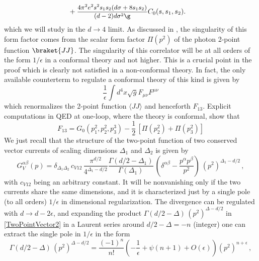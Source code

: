 \documentclass[a4paper,11pt,openright,twoside]{book}
\newcommand{\sdfrac}[2]{\mbox{\small$\displaystyle\frac{#1}{#2}$}}
\numberwithin{equation}{section}
\begin{document}
{{\begin{align}
	&+\sdfrac{4 \pi ^2 e^2 s^2 s_1 s_2 ( d \sigma +8 s_1 s_2)}{( d-2)  d \sigma ^2 \g}C_0(s,s_1,s_2).
\end{align}
which we will study in the $d\to 4$ limit. As discussed in \cite{Giannotti:2008cv, Armillis:2009pq}, the singularity of this form factor comes from the scalar form factor $\Pi(p^2)$ of the photon 2-point function $\braket{JJ}$. 
The singularity of this correlator will be at all orders of the form $1/\epsilon$ in a conformal theory and not higher. This is 
a crucial point in the proof which is clearly not satisfied in a non-conformal theory. In fact, the only available counterterm to regulate a conformal theory of this kind is given by 
\begin{equation}
	\frac{1}{\epsilon}\int d^4 x \sqrt{g} F_{\mu\nu}F^{\mu\nu}
\end{equation}
which renormalizes the 2-point function $\langle JJ \rangle$ and henceforth $F_{13}$. Explicit computations in QED at one-loop, where the theory is conformal, show that 
\begin{equation}
	\label{f13}
	F_{13}= G_0(p_1^2, p_2^2,p_3^3) -\frac{1}{2} \, [\Pi (p_2^2) +\Pi (p_3^2)]
\end{equation}
We just recall that the structure of the two-point function of two conserved vector currents of scaling dimensions $\Delta_1$ and $\Delta_2$ is given by \cite{Coriano:2013jba}
\begin{equation}
	\label{TwoPointVector2}
	G_V^{\alpha \beta}(p) = \delta_{\Delta_1 \Delta_2}  \, c_{V 12}\, 
	\frac{\pi^{d/2}}{4^{\Delta_1 - d/2}} \frac{\Gamma(d/2 - \Delta_1)}{\Gamma(\Delta_1)}\,
	\left( \delta^{\alpha \beta} -\frac{p^\alpha p^\beta}{p^2} \right)\
	(p^2)^{\Delta_1-d/2} \,,
\end{equation}
%
with $c_{V12}$ being an arbitrary constant. It will be nonvanishing only if the two currents share the same dimensions, and it is characterized just by a single pole (to all orders) ${1/\epsilon}$ in dimensional regularization. The divergence can be regulated with $d \to d - 2 \epsilon$, and expanding the product $\Gamma(d/2-\Delta)\,(p^2)^{\Delta - d/2}$ in \ref{TwoPointVector2} in a Laurent series around $d/2 - \Delta = -n$ (integer) one can extract the single pole in $1/\epsilon$ in the form \cite{Coriano:2013jba}
%
%
\begin{equation}
	\label{expansion}
	\Gamma\left(d/2-\Delta\right)\,(p^2)^{\Delta-d/2} = \frac{(-1)^n}{n!} \left( - \frac{1}{\epsilon} + \psi(n+1)  + O(\epsilon) \right) (p^2)^{n + \epsilon} \,,
\end{equation}
}}
\end{document}
